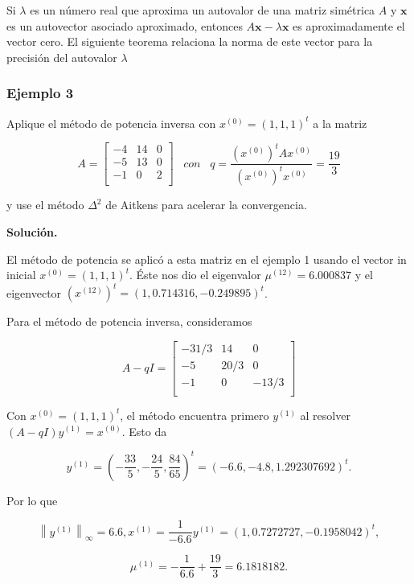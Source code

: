 \documentclass{report}
\numberwithin{subsection}{section} %
\begin{document}
Si $\lambda$ es un número real que aproxima un autovalor de una matriz simétrica $A$ y $\textbf{x}$ es un autovector asociado aproximado, entonces $A\textbf{x} - \lambda\textbf{x}$ es aproximadamente el vector cero. El siguiente teorema relaciona la norma de este vector para la precisión del autovalor $\lambda$

\subsubsection*{Ejemplo 3} %
        
Aplique el método de potencia inversa con $x^{(0)} = (1, 1, 1)^t$ a la matriz

$$A =\begin{bmatrix}
    -4 & 14 & 0 \\
    -5 & 13 & 0 \\
    -1 & 0 & 2 \\
\end{bmatrix} \;\;\; con \;\;\; q = \frac{(x^{(0)})^t Ax^{(0)}}{(x^{(0)})^tx^{(0)}} = \frac{19}{3}$$

y use el método $\Delta^2$ de Aitkens para acelerar la convergencia.

{\bf Solución.}

El método de potencia se aplicó a esta matriz en el ejemplo 1 usando el vector in inicial $x^{(0)} = (1,1,1)^t.$ Éste nos dio el eigenvalor $\mu^{(12)} = 6.000837$ y el eigenvector $(x^{(12)})^t = (1, 0.714316, -0.249895)^t$.

Para el método de potencia inversa, consideramos

$$A - qI =\begin{bmatrix}
    -31/3 & 14 & 0 \\
    -5 & 20/3 & 0 \\
    -1 & 0 & -13/3 \\
\end{bmatrix}$$

Con $x^(0) = (1, 1, 1)^t$, el método encuentra primero $y^{(1)}$ al resolver $(A- qI)y^{(1)} = x^(0)$. Esto da

$$y^{(1)} = (-\frac{33}{5},-\frac{24}{5},\frac{84}{65})^t = (-6.6,-4.8, 1.292307692)^t.$$

Por lo que

$$\left\|y^{(1)}\right\|_{\infty} = 6.6, x^{(1)} = \frac{1}{-6.6}y^{(1)} = (1, 0.7272727,-0.1958042)^t,$$

$$μ^{(1)} = -\frac{1}{6.6} + \frac{19}{3} = 6.1818182.$$
\end{document}
